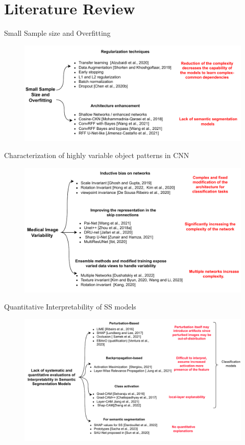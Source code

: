 \documentclass[aspectratio=169]{beamer}
\begin{document}
\section{Literature Review}

\begin{frame}{Small Sample size and
Overfitting}

\begin{figure}
    \centering
    \includegraphics[width=0.8\linewidth]{Figures/State-of-the-arr-obj1.pdf}
\end{figure}   

\end{frame}

\begin{frame}{Characterization of
highly variable object patterns in CNN}
\begin{figure}
    \centering
    \includegraphics[width=0.8\linewidth]{Figures/State-of-the-ar-obj2.pdf}
\end{figure}    
\end{frame}


\begin{frame}{ Quantitative Interpretability of SS models}
\begin{figure}
    \centering
    \includegraphics[width=0.8\linewidth]{Figures/State-of-the-ar-obj3.pdf}
\end{figure}    
\end{frame}
\end{document}
